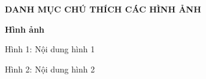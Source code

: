 
\newpage
\changefontsizes{16pt}
\centerline{\textbf{DANH MỤC CHÚ THÍCH CÁC HÌNH ẢNH}}


\vspace{1cm}
\changefontsizes{14pt}
\setlength{\parindent}{0cm}
\bigskip
\textbf{Hình ảnh}

\smallskip
\setlength{\parindent}{1cm}
\changefontsizes{13pt}
Hình 1: Nội dung hình 1

\smallskip
Hình 2: Nội dung hình 2

